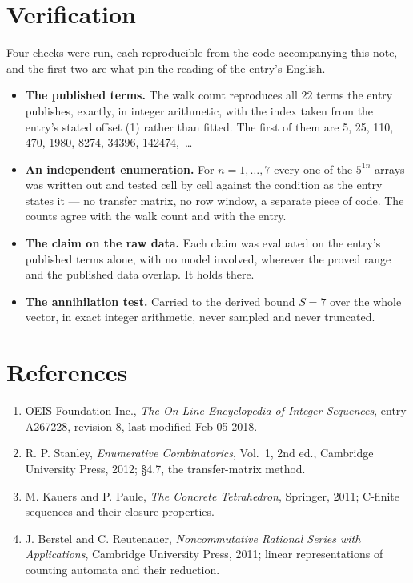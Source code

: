 \documentclass[11pt]{article}
\theoremstyle{definition}
\begin{document}
\section{Verification}

Four checks were run, each reproducible from the code accompanying this note, and the first two are what pin the reading of the entry's English.

\begin{itemize}

\item {\bfseries The published terms.} The walk count reproduces all 22 terms the entry publishes, exactly, in integer arithmetic, with the index taken from the entry's stated offset (1) rather than fitted. The first of them are 5, 25, 110, 470, 1980, 8274, 34396, 142474,~\dots

\item {\bfseries An independent enumeration.} For $n = 1,\dots,7$ every one of the $5^{1n}$ arrays was written out and tested cell by cell against the condition as the entry states it --- no transfer matrix, no row window, a separate piece of code. The counts agree with the walk count and with the entry.

\item {\bfseries The claim on the raw data.} Each claim was evaluated on the entry's published terms alone, with no model involved, wherever the proved range and the published data overlap. It holds there.

\item {\bfseries The annihilation test.} Carried to the derived bound $S = 7$ over the whole vector, in exact integer arithmetic, never sampled and never truncated.

\end{itemize}

\section{References}

\begin{enumerate}

\item OEIS Foundation Inc., \emph{The On-Line Encyclopedia of Integer Sequences}, entry \href{https://oeis.org/A267228}{A267228}, revision 8, last modified Feb 05 2018.

\item R. P. Stanley, \emph{Enumerative Combinatorics}, Vol.~1, 2nd ed., Cambridge University Press, 2012; \S4.7, the transfer-matrix method.

\item M. Kauers and P. Paule, \emph{The Concrete Tetrahedron}, Springer, 2011; C-finite sequences and their closure properties.

\item J. Berstel and C. Reutenauer, \emph{Noncommutative Rational Series with Applications}, Cambridge University Press, 2011; linear representations of counting automata and their reduction.

\end{enumerate}
\end{document}
